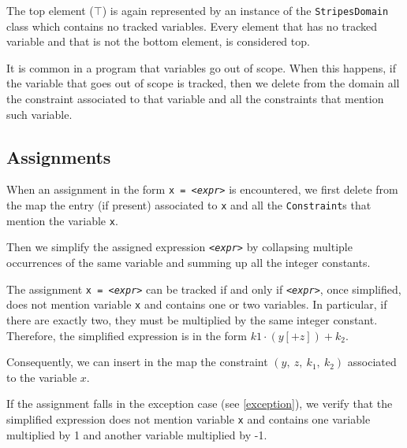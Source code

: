 \documentclass{article}
\newcommand{\spc}{\:}
\newcommand{\constraint}[4]{(#1,\spc #2,\spc #3,\spc #4)}
\newcommand{\plchold}[1]{\texttt{\textit{<#1>}}}
\begin{document}
The top element ($\top$) is again represented by an instance of the \texttt{StripesDomain} class which contains no tracked variables. Every element that has no tracked variable and that is not the bottom element, is considered top.

It is common in a program that variables go out of scope. When this happens, if the variable that goes out of scope is tracked, then we delete from the domain all the constraint associated to that variable and all the constraints that mention such variable.

\subsection{Assignments}
When an assignment in the form \texttt{x = \plchold{expr}} is encountered, we first delete from the map the entry (if present) associated to \texttt{x} and all the \texttt{Constraint}s that mention the variable \texttt{x}.

Then we simplify the assigned expression \plchold{expr} by collapsing multiple occurrences of the same variable and summing up all the integer constants.


The assignment \texttt{x = \plchold{expr}} can be tracked if and only if \plchold{expr}, once simplified, does not mention variable \texttt{x} and contains one or two variables. In particular, if there are exactly two, they must be multiplied by the same integer constant. Therefore, the simplified expression is in the form $k1\cdot(y[+z])+k_2$.

Consequently, we can insert in the map the constraint $\constraint{y}{z}{k_1}{k_2}$ associated to the variable $x$.

If the assignment falls in the exception case (see \ref{exception}), we verify that the simplified expression does not mention variable \texttt{x} and contains one variable multiplied by 1 and another variable multiplied by -1.
\end{document}
